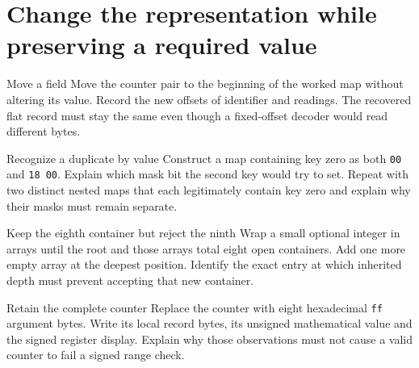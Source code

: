 \section{Change the representation while preserving a required value}
\begin{MARSExercise}{Move a field}
Move the counter pair to the beginning of the worked map without altering its value.
Record the new offsets of identifier and readings. The recovered flat record must stay
the same even though a fixed-offset decoder would read different bytes.
\end{MARSExercise}

\begin{MARSExercise}{Recognize a duplicate by value}
Construct a map containing key zero as both \texttt{00} and \texttt{18 00}. Explain which
mask bit the second key would try to set. Repeat with two distinct nested maps that
each legitimately contain key zero and explain why their masks must remain separate.
\end{MARSExercise}

\begin{MARSExercise}{Keep the eighth container but reject the ninth}
Wrap a small optional integer in arrays until the root and those arrays total eight
open containers. Add one more empty array at the deepest position. Identify the exact
entry at which inherited depth must prevent accepting that new container.
\end{MARSExercise}

\begin{MARSExercise}{Retain the complete counter}
Replace the counter with eight hexadecimal \texttt{ff} argument bytes. Write its local
record bytes, its unsigned mathematical value and the signed register display. Explain
why those observations must not cause a valid counter to fail a signed range check.
\end{MARSExercise}
